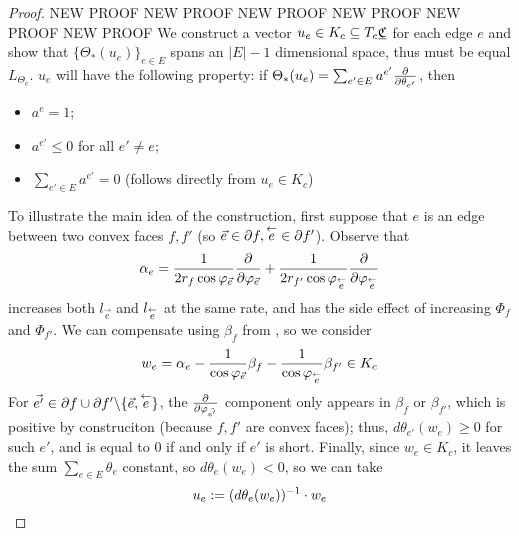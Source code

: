 \begin{proof}
NEW PROOF NEW PROOF NEW PROOF NEW PROOF NEW PROOF NEW PROOF 
We construct a vector $u_e \in K_c \subseteq T_c {\underline{\mathfrak{C}}}$ for each edge $e$
and show that $\{\Theta_*(u_e)\}_{e\in E}$ spans an
$|E|-1$ dimensional space,
thus must be equal $L_{\Theta_c}$.
$u_e$ will have the following property:
if $\Theta_*(u_e) = \sum_{e' \in E} a^{e'} {\frac{\partial}{\partial \theta_{e'}}}$, then
\begin{itemize}
	\item $a^e = 1$;
	\item $a^{e'} \leq 0$ for all $e' \neq e$;
	\item $\sum_{e' \in E} a^{e'} = 0$ (follows directly from $u_e \in K_c$)
\end{itemize}


To illustrate the main idea of the construction,
first suppose that $e$ is an edge between two convex faces $f, f'$
(so $\vec{e} \in \partial f, \overset{\leftarrow}{e} \in \partial f'$).
Observe that %
\begin{equation}
\label{e:alpha_e}
\alpha_e = \frac{1}{2 r_f \cos \varphi_{\vec{e}}} {\frac{\partial}{\partial \varphi_{\vec{e}}}}
+ \frac{1}{2 r_{f'}\cos \varphi_{\overset{\leftarrow}{e}}} {\frac{\partial}{\partial \varphi_{\overset{\leftarrow}{e}}}}
\end{equation}
increases both $l_{\vec{e}}$ and $l_{\overset{\leftarrow}{e}}$ at the same rate,
and has the side effect of
increasing $\Phi_f$ and $\Phi_{f'}$.
We can compensate using $\beta_f$ from ,
so we consider
\[
w_e = \alpha_e - \frac{1}{\cos \varphi_{\vec{e}}} \beta_f
	- \frac{1}{\cos \varphi_{\overset{\leftarrow}{e}}} \beta_{f'} \in K_c
\]
For $\vec{e'} \in \partial f \cup \partial f' \backslash \{\vec{e},\overset{\leftarrow}{e}\}$,
the ${\frac{\partial}{\partial \varphi_{\vec{e'}}}}$ component only appears in $\beta_f$
or $\beta_{f'}$, which is positive by construciton
(because $f,f'$ are convex faces);
thus, $d\theta_{e'}(w_e) \geq 0$ for such $e'$, and
is equal to 0 if and only if $e'$ is short.
Finally, since $w_e \in K_c$, it leaves the sum $\sum_{e\in E} \theta_e$
constant, so $d\theta_e(w_e) < 0$, so we can take
\begin{equation}
\label{e:u_e}
u_e := (d\theta_e(w_e))^{-1} \cdot w_e
\end{equation}


\end{proof}
